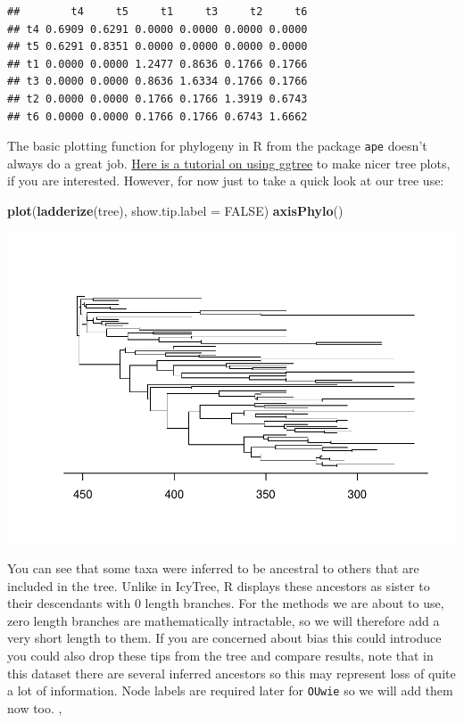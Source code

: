 \documentclass[]{article}
\newenvironment{Shaded}{\begin{snugshade}}{\end{snugshade}}
\newcommand{\KeywordTok}[1]{\textcolor[rgb]{0.13,0.29,0.53}{\textbf{#1}}}
\newcommand{\DataTypeTok}[1]{\textcolor[rgb]{0.13,0.29,0.53}{#1}}
\newcommand{\OtherTok}[1]{\textcolor[rgb]{0.56,0.35,0.01}{#1}}
\newcommand{\NormalTok}[1]{#1}
\begin{document}
\begin{verbatim}
##        t4     t5     t1     t3     t2     t6
## t4 0.6909 0.6291 0.0000 0.0000 0.0000 0.0000
## t5 0.6291 0.8351 0.0000 0.0000 0.0000 0.0000
## t1 0.0000 0.0000 1.2477 0.8636 0.1766 0.1766
## t3 0.0000 0.0000 0.8636 1.6334 0.1766 0.1766
## t2 0.0000 0.0000 0.1766 0.1766 1.3919 0.6743
## t6 0.0000 0.0000 0.1766 0.1766 0.6743 1.6662
\end{verbatim}

The basic plotting function for phylogeny in R from the package
\texttt{ape} doesn't always do a great job.
\href{https://4va.github.io/biodatasci/r-ggtree.html}{Here is a tutorial
on using ggtree} to make nicer tree plots, if you are interested.
However, for now just to take a quick look at our tree use:

\begin{Shaded}
\begin{Highlighting}[]
\KeywordTok{plot}\NormalTok{(}\KeywordTok{ladderize}\NormalTok{(tree), }\DataTypeTok{show.tip.label =} \OtherTok{FALSE}\NormalTok{)}
\KeywordTok{axisPhylo}\NormalTok{() }
\end{Highlighting}
\end{Shaded}

\includegraphics{module_08_files/figure-latex/unnamed-chunk-6-1.pdf}

You can see that some taxa were inferred to be ancestral to others that
are included in the tree. Unlike in IcyTree, R displays these ancestors
as sister to their descendants with 0 length branches. For the methods
we are about to use, zero length branches are mathematically
intractable, so we will therefore add a very short length to them. If
you are concerned about bias this could introduce you could also drop
these tips from the tree and compare results, note that in this dataset
there are several inferred ancestors so this may represent loss of quite
a lot of information. Node labels are required later for \texttt{OUwie}
so we will add them now too. ,
\end{document}
